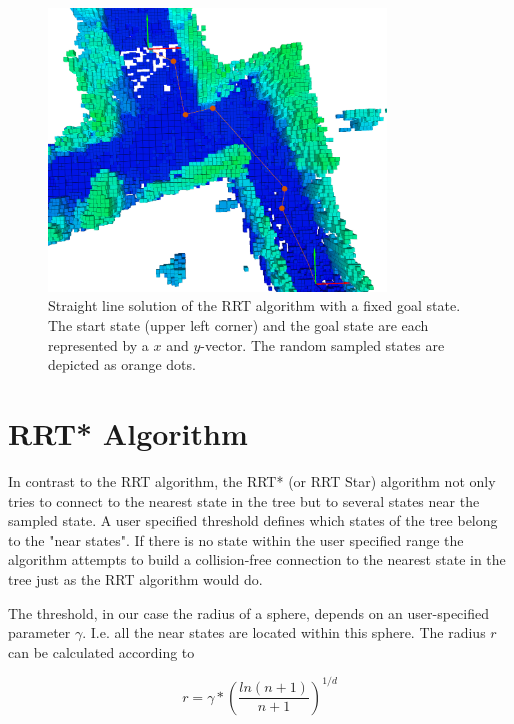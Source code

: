 \begin{figure}[H]
   \centering
   \includegraphics[trim = 50mm 0mm 30mm 0mm,clip,width=0.8\textwidth]{pics/smallGammaP.png}
   \caption{Straight line solution of the RRT algorithm with a fixed goal state. The start state (upper left corner) and the goal state are each represented by a $x$ and  $y$-vector. The random sampled states are depicted as orange dots.}
   \label{pic:smallGamma}
\end{figure}



\section{RRT* Algorithm}\label{sec:RRTstar}

In contrast to the RRT algorithm, the RRT* (or RRT Star) algorithm not only tries to connect to the nearest state in the tree but to several states near the sampled state. A user specified threshold defines which states of the tree belong to the "near states". If there is no state within the user specified range the algorithm attempts to build a collision-free connection to the nearest state in the tree just as the RRT algorithm would do.  \newline

The threshold, in our case the radius of a sphere, depends on an user-specified parameter $\gamma$. I.e. all the near states are located within this sphere. The radius $r$ can be calculated according to


\begin{equation}
r = \gamma * \left(\frac{ln(n+1)}{n+1}\right)^{1/d}
\label{equ:ballradius}
\end{equation}

